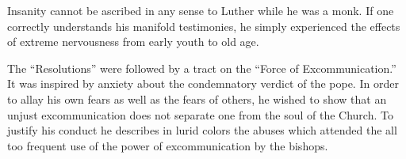 Insanity cannot be ascribed in any sense to Luther while
he was a monk. If one correctly understands his manifold testimonies,
he simply experienced the effects of extreme nervousness from early
youth to old age.

The “Resolutions” were followed by a tract on the “Force of Excommunication.”
It was inspired by anxiety about the condemnatory
verdict of the pope. In order to allay his own fears as well as the
fears of others, he wished to show that an unjust excommunication
does not separate one from the soul of the Church. To justify his
conduct he describes in lurid colors the abuses which attended the
all too frequent use of the power of excommunication by the bishops.
